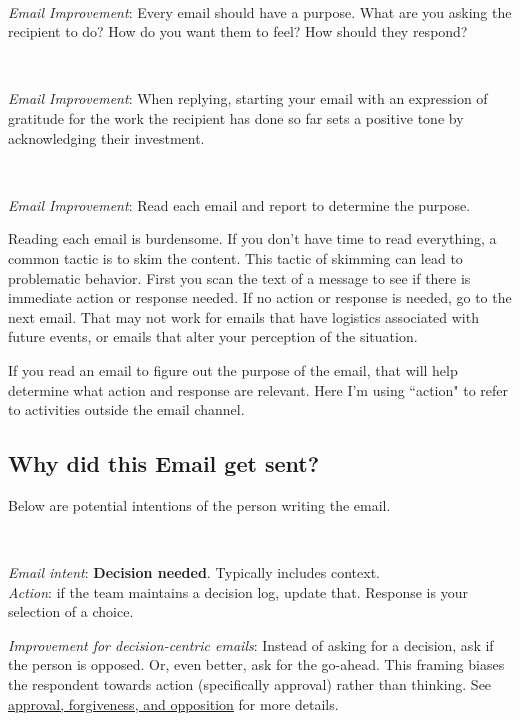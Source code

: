 \ \\
\begin{samepage}
\textit{Email Improvement}: Every email should have a purpose. What are you asking the recipient to do? How do you want them to feel? How should they respond?
\end{samepage}

\ \\
\begin{samepage}
\textit{Email Improvement}: When replying, starting your email with an expression of gratitude for the work the recipient has done so far sets a positive tone by acknowledging their investment.
\end{samepage}

\ \\
\begin{samepage}
\textit{Email Improvement}: Read each email and report to determine the purpose. 
\end{samepage}

Reading each email is burdensome. If you don't have time to read everything, a common tactic is to skim the content. 
This tactic of skimming can lead to problematic behavior. First you scan the text of a message to see if there is immediate action or response needed. If no action or response is needed, go to the next email. 
That may not work for emails that have logistics associated with future events, or emails that alter your perception of the situation.

If you read an email to figure out the purpose of the email, that will help determine what action and response are relevant. Here I'm using ``action" to refer to activities outside the email channel. 


\subsection*{Why did this Email get sent?}
Below are potential intentions of the person writing the email. 

\ \\
\begin{samepage}
\textit{Email intent}: \textbf{Decision needed}. Typically includes context. \\
\textit{Action}: if the team maintains a decision log, update that.
Response is your selection of a choice.
\end{samepage}

\textit{Improvement for decision-centric emails}: Instead of asking for a decision, ask if the person is opposed. Or, even better, ask for the go-ahead. 
This framing biases the respondent towards action (specifically approval) rather than thinking. 
See 
\hyperref[sec:approval-forgiveness-opposition]{approval, forgiveness, and opposition}
%
for more details.

